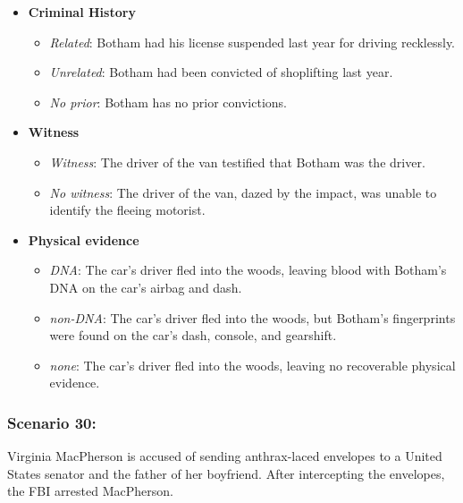 \documentclass[
]{article}
\providecommand{\tightlist}{%
  \setlength{\itemsep}{0pt}\setlength{\parskip}{0pt}}
\begin{document}
\begin{itemize}
\tightlist
\item
  \textbf{Criminal History}

  \begin{itemize}
  \tightlist
  \item
    \emph{Related}: Botham had his license suspended last year for
    driving recklessly.
  \item
    \emph{Unrelated}: Botham had been convicted of shoplifting last
    year.
  \item
    \emph{No prior}: Botham has no prior convictions.
  \end{itemize}
\item
  \textbf{Witness}

  \begin{itemize}
  \tightlist
  \item
    \emph{Witness}: The driver of the van testified that Botham was the
    driver.
  \item
    \emph{No witness}: The driver of the van, dazed by the impact, was
    unable to identify the fleeing motorist.
  \end{itemize}
\item
  \textbf{Physical evidence}

  \begin{itemize}
  \tightlist
  \item
    \emph{DNA}: The car's driver fled into the woods, leaving blood with
    Botham's DNA on the car's airbag and dash.
  \item
    \emph{non-DNA}: The car's driver fled into the woods, but Botham's
    fingerprints were found on the car's dash, console, and gearshift.
  \item
    \emph{none}: The car's driver fled into the woods, leaving no
    recoverable physical evidence.
  \end{itemize}
\end{itemize}

\hypertarget{scenario-30}{%
\subsubsection{Scenario 30:}\label{scenario-30}}

Virginia MacPherson is accused of sending anthrax-laced envelopes to a
United States senator and the father of her boyfriend. After
intercepting the envelopes, the FBI arrested MacPherson.
\end{document}

